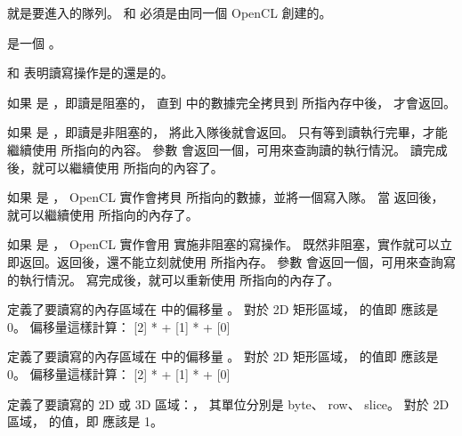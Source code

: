  就是要進入的隊列。
 和  必須是由同一個 OpenCL 創建的。

 是一個 。

 和 
表明讀寫操作是{}的還是{}的。

如果  是 ，即讀是阻塞的，
直到  中的數據完全拷貝到  所指內存中後，
 才會返回。

如果  是 ，即讀是非阻塞的，
 將此入隊後就會返回。
只有等到讀執行完畢，才能繼續使用  所指向的內容。
參數  會返回一個，可用來查詢讀的執行情況。
讀完成後，就可以繼續使用  所指向的內容了。

如果  是 ，
OpenCL 實作會拷貝  所指向的數據，並將一個寫入隊。
當  返回後，
就可以繼續使用  所指向的內存了。

如果  是 ，
OpenCL 實作會用  實施非阻塞的寫操作。
既然非阻塞，實作就可以立即返回。返回後，還不能立刻就使用  所指內存。
參數  會返回一個，可用來查詢寫的執行情況。
寫完成後，就可以重新使用  所指向的內存了。

 定義了要讀寫的內存區域在  中的偏移量 。
對於 2D 矩形區域， 的值即  應該是 0。
偏移量這樣計算：
\startformula \startalign
 \NC  \NC {}[2] *  \NR
 \NC + \NC {}[1] *  \NR
 \NC + \NC {}[0] \NR
\stopalign \stopformula

 定義了要讀寫的內存區域在  中的偏移量 。
對於 2D 矩形區域， 的值即  應該是 0。
偏移量這樣計算：
\startformula \startalign
 \NC  \NC {}[2] *  \NR
 \NC + \NC {}[1] *  \NR
 \NC + \NC {}[0] \NR
\stopalign \stopformula

 定義了要讀寫的 2D 或 3D 區域：，
其單位分別是 byte、 row、 slice。
對於 2D 區域，  的值，即  應該是 1。

